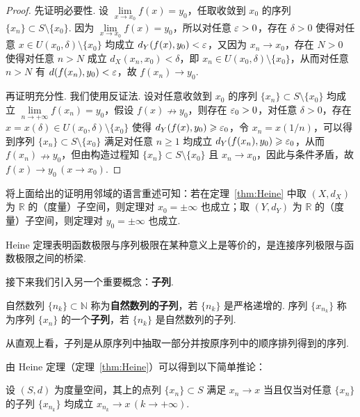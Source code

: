 \documentclass[../main.tex]{subfiles}
\begin{document}
\begin{proof}
    先证明必要性. 设 $\lim\limits_{x \to x_0} f(x) = y_0$，任取收敛到 $x_0$ 的序列 $\{x_n\} \subset S \setminus \{x_0\}$. 因为 $\lim\limits_{x \to x_0} f(x) = y_0$，所以对任意 $\varepsilon > 0$，存在 $\delta > 0$ 使得对任意 $x \in U(x_0, \delta) \setminus \{x_0\}$ 均成立 $d_Y(f(x), y_0) < \varepsilon$，又因为 $x_n \to x_0$，存在 $N > 0$ 使得对任意 $n > N$ 成立 $d_X(x_n, x_0) < \delta$，即 $x_n \in U(x_0, \delta) \setminus \{x_0\}$，从而对任意 $n > N$ 有 $d(f(x_n), y_0) < \varepsilon$，故 $f(x_n) \to y_0$. 

    再证明充分性. 我们使用反证法. 设对任意收敛到 $x_0$ 的序列 $\{x_n\} \subset S \setminus \{x_0\}$ 均成立 $\lim\limits_{n \to +\infty} f(x_n) = y_0$，假设 $f(x) \nrightarrow y_0$，则存在 $\varepsilon_0 > 0$，对任意 $\delta > 0$，存在 $x = x(\delta) \in U(x_0, \delta) \setminus \{x_0\}$ 使得 $d_Y(f(x), y_0) \geqslant \varepsilon_0$，令 $x_n = x(1/n)$，可以得到序列 $\{x_n\} \subset S \setminus \{x_0\}$ 满足对任意 $n \geqslant 1$ 均成立 $d_Y(f(x_n), y_0) \geqslant \varepsilon_0$，从而 $f(x_n) \nrightarrow y_0$，但由构造过程知 $\{x_n\} \subset S \setminus \{x_0\}$ 且 $x_n \to x_0$，因此与条件矛盾，故 $f(x) \to y_0\,(x \to x_0)$. 
\end{proof}

\begin{remark}
    将上面给出的证明用邻域的语言重述可知：若在定理~\ref{thm:Heine} 中取 $(X, d_X)$ 为 $\mathbb R$ 的（度量）子空间，则定理对 $x_0 = \pm \infty$ 也成立；取 $(Y, d_Y)$ 为 $\mathbb R$ 的（度量）子空间，则定理对 $y_0 = \pm \infty$ 也成立. 
\end{remark}

Heine 定理表明函数极限与序列极限在某种意义上是等价的，是连接序列极限与函数极限之间的桥梁. 

接下来我们引入另一个重要概念：\textbf{子列}. 

\begin{definition}[子列的定义]
    自然数列 $\{n_k\} \subset \mathbb N$ 称为\textbf{自然数列的子列}，若 $\{n_k\}$ 是严格递增的. 序列 $\{x_{n_k}\}$ 称为序列 $\{x_n\}$ 的一个\textbf{子列}，若 $\{n_k\}$ 是自然数列的子列. 
\end{definition}

\begin{remark}
    从直观上看，子列是从原序列中抽取一部分并按原序列中的顺序排列得到的序列. 
\end{remark}

由 Heine 定理（定理~\ref{thm:Heine}）可以得到以下简单推论：

\begin{corollary} \label{cor:Heine-subseq}
    设 $(S, d)$ 为度量空间，其上的点列 $\{x_n\} \subset S$ 满足 $x_n \to x$ 当且仅当对任意 $\{x_n\}$ 的子列 $\{x_{n_k}\}$ 均成立 $x_{n_k} \to x\,(k \to +\infty)$. 
\end{corollary}
\end{document}

